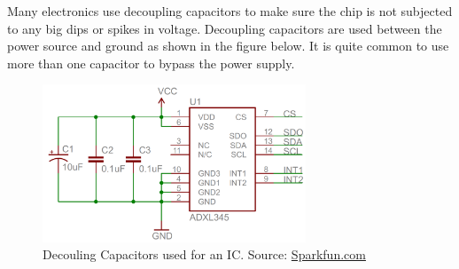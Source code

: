 \documentclass{article}
\begin{document}
Many electronics use decoupling capacitors to make sure the chip is not subjected to any big dips or spikes in voltage.
Decoupling capacitors are used between the power source and ground as shown in the figure below. It is quite common to use more than one capacitor to bypass the power supply. 

\begin{figure} [h]
    \centering
    \includegraphics[width=0.7\textwidth]{img/DecouplingCap.png}
    \caption{Decouling Capacitors used for an IC. Source: \href{https://learn.sparkfun.com/tutorials/capacitors/application-examples}{Sparkfun.com}}
    \label{fig:DecouplingCap}
\end{figure}
\end{document}
